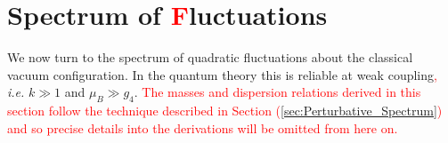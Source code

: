 

\section{Spectrum of \textcolor{red}{F}luctuations}
\label{sec3}
We now turn to the spectrum of quadratic fluctuations about the classical vacuum configuration. In the quantum theory this is reliable at weak coupling\textcolor{red}{,} \textit{i.e.} $k\gg 1$ and $\mu_B\gg g_4$. \textcolor{red}{The masses and dispersion relations derived in this section follow the technique described in Section (\ref{sec:Perturbative_Spectrum}) and so precise details into the derivations will be omitted from here on.}
